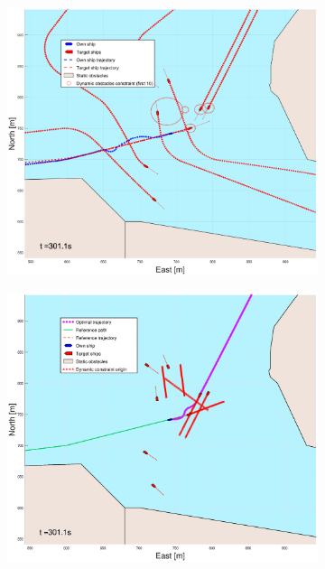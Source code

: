 \begin{figure}[ht!]\ContinuedFloat
    \begin{subfigure}[b]{0.49\textwidth}
        \centering
        \includegraphics[width=\textwidth]{Images/Figures/Trheimfjord/_Simple_1fig1_time=301}
    \end{subfigure}
    \hfill
    \begin{subfigure}[b]{0.499\textwidth}
        \centering
        \includegraphics[width=\textwidth]{Images/Figures/Trheimfjord/_Simple_1fig999_time=301}

\end{subfigure}
\end{figure}
